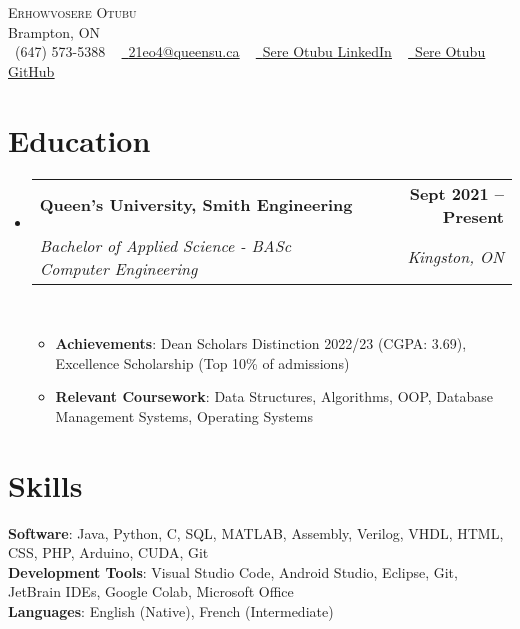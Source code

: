 \documentclass[letterpaper,11pt]{article}
\makeatletter
\newcommand{\resumeItem}[1]{
  \item\small{
    {#1 \vspace{-2pt}}
  }
}
\newcommand{\resumeSubheading}[4]{
  \vspace{-2pt}\item
    \begin{tabular*}{1.0\textwidth}[t]{l@{\extracolsep{\fill}}r}
      \textbf{#1} & \textbf{\small #2} \\
      \textit{\small#3} & \textit{\small #4} \\
    \end{tabular*}\vspace{-7pt}
}
\newcommand{\resumeSubHeadingListStart}{\begin{itemize}[leftmargin=0.0in, label={}]}
\newcommand{\resumeSubHeadingListEnd}{\end{itemize}}
\newcommand{\resumeItemListStart}{\begin{itemize}}
\newcommand{\resumeItemListEnd}{\end{itemize}\vspace{-5pt}}
\makeatother
\begin{document}

\begin{center}
    {\Huge \scshape Erhowvosere Otubu} \\ \vspace{1pt}
    Brampton, ON \\ \vspace{1pt}
    \small \raisebox{-0.1\height}\faPhone\ (647) 573-5388 ~ \href{mailto:youremail@email.com}{\raisebox{-0.2\height}\faEnvelope\  \underline{21eo4@queensu.ca}} ~ 
    \href{https://www.linkedin.com/in/sere-otubu-9782b1251/}{\raisebox{-0.2\height}\faLinkedin\ \underline{Sere Otubu LinkedIn}}  ~
    \href{https://github.com/IceBergSlim111}{\raisebox{-0.2\height}\faGithub\ \underline{Sere Otubu GitHub}}
    \vspace{-8pt}
\end{center}

\section{Education}
  \resumeSubHeadingListStart
    \resumeSubheading
      {Queen's University, Smith Engineering}{Sept 2021 -- Present}
      {Bachelor of Applied Science - BASc Computer Engineering}{Kingston, ON}\
      \resumeItemListStart
      \resumeItem{\textbf{Achievements}: Dean Scholars Distinction  2022/23 (CGPA: 3.69), Excellence Scholarship (Top 10\% of admissions)}
      \resumeItem{\textbf{Relevant Coursework}: Data Structures, Algorithms, OOP, Database Management Systems, Operating Systems}
      \resumeItemListEnd
  \resumeSubHeadingListEnd

\section{Skills}
 \begin{itemize}[leftmargin=0.15in, label={}]
    \small{\item{
     \textbf{Software}{: Java, Python, C, SQL, MATLAB, Assembly, Verilog, VHDL, HTML, CSS, PHP, Arduino, CUDA, Git} \\
    \textbf{Development Tools}{: Visual Studio Code, Android Studio, Eclipse, Git, JetBrain IDEs, Google Colab, Microsoft Office} \\
    \textbf{Languages}{: English (Native), French (Intermediate)} \\
    }}
 \end{itemize}
 \vspace{-16pt}
\end{document}

